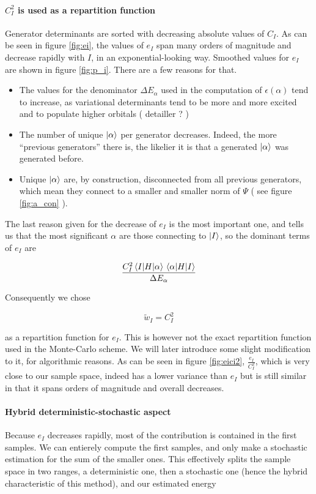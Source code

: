 \documentclass[./thesis.tex]{subfiles}
\begin{document}
\paragraph{$C_I^2$ is used as a repartition function}
Generator determinants are sorted with decreasing absolute values of $C_I$.
	As can be seen in figure \ref{fig:ei}, the values of $e_I$ span many orders of magnitude and decrease rapidly with $I$, in an exponential-looking way. Smoothed values for $e_I$ are shown in figure \ref{fig:p_i}. There are a few reasons for that.
\begin{itemize}
	\item
	The values for the denominator $\Delta E_\alpha$ used in the computation of $\epsilon(\alpha)$ tend to increase, as variational determinants tend to be more and more excited and to populate higher orbitals ( detailler ? )
	\item
	The number of unique $\ket \alpha$ per generator decreases. Indeed, the more ``previous generators'' there is, the likelier it is that a generated $\ket \alpha$ was generated before.
	\item
	Unique $\ket \alpha$ are, by construction, disconnected from all previous generators, which mean they connect to a smaller and smaller norm of $\Psi$ ( see figure \ref{fig:a_con} ). 
\end{itemize}


The last reason given for the decrease of $e_I$ is the most important one, and tells us that the most significant $\alpha$ are those connecting to ${\ket{I}}$, so the dominant terms of $e_I$ are 

\begin{equation}
\frac{C_I^2 \mel{I}{H}{\alpha}\mel{\alpha}{H}{I}}{\Delta E_{\alpha}}
\end{equation}

Consequently we chose

\begin{equation}
\tilde w_I = C_I^2
\end{equation}

as a repartition function for $e_I$. This is however not the exact repartition function used in the Monte-Carlo scheme. We will later introduce some slight modification to it, for algorithmic reasons.
As can be seen in figure \ref{fig:eici2}, $\frac{e_I}{C_I^2}$, which is very close to our sample space, indeed has a lower variance than $e_I$ but is still similar in that it spans orders of magnitude and overall decreases.

\paragraph{Hybrid deterministic-stochastic aspect}
Because $e_I$ decreases rapidly, most of the contribution is contained in the first samples. We can entierely compute the first samples, and only make a stochastic estimation for the sum of the smaller ones. This effectively splits the sample space in two ranges, a deterministic one, then a stochastic one (hence the hybrid characteristic of this method), and our estimated energy
\end{document}
